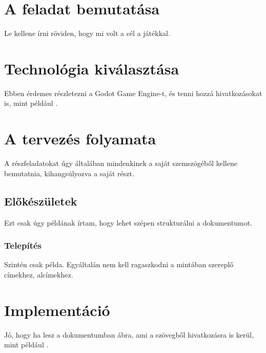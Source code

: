 \documentclass[12pt,a4paper]{article}
\begin{document}


\newpage

\pagestyle{empty}

\cleardoublepage
{}
\tableofcontents
\cleardoublepage
{}

\newpage

\pagestyle{fancy}

\section{A feladat bemutatása}

Le kellene írni röviden, hogy mi volt a cél a játékkal.

\section{Technológia kiválasztása}

Ebben érdemes részletezni a Godot Game Engine-t, és tenni hozzá hivatkozásokat is, mint például \cite{salmela2022game,holfeld2023relevance}.

\section{A tervezés folyamata}

A részfeladatokat úgy általában mindenkinek a saját szemszögéből kellene bemutatnia, kihangsúlyozva a saját részt.

\subsection{Előkészületek}

Ezt csak úgy példának írtam, hogy lehet szépen strukturálni a dokumentumot.

\subsubsection{Telepítés}

Szintén csak példa. Egyáltalán nem kell ragaszkodni a mintában szereplő címekhez, alcímekhez.

\section{Implementáció}

Jó, hogy ha lesz a dokumentumban ábra, ami a szövegből hivatkozásra is kerül, mint például .
\end{document}
